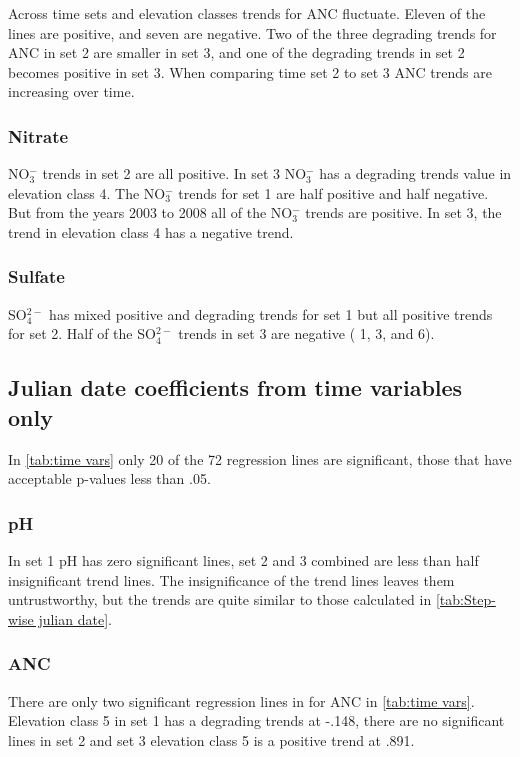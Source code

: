 Across time sets and elevation classes trends for ANC fluctuate.  Eleven of the lines are positive, and seven are negative.   Two of the three degrading trends for ANC in set 2 are smaller in set 3, and one of the degrading trends in set 2 becomes positive in set 3.  When comparing time set 2 to set 3 ANC trends are increasing over time. 

\subsubsection{Nitrate}

NO$_3^-$ trends in set 2 are all positive. In set 3 NO$_3^-$ has a degrading trends value in elevation class 4. The NO$_3^-$ trends for set 1 are half positive and half negative. But from the years 2003 to 2008 all of the NO$_3^-$ trends are positive. In set 3, the trend in elevation class 4 has a negative trend.

\subsubsection{Sulfate}

SO$_4^{2-}$ has mixed positive and degrading trends for set 1 but all positive trends for set 2. Half of the SO$_4^{2-}$ trends in set 3 are negative ( 1, 3, and 6).

\subsection{Julian date coefficients from time variables only}

In \autoref{tab:time vars} only 20 of the 72 regression lines are significant, those that have acceptable p-values less than .05.

\subsubsection{pH}

In set 1 pH has zero significant lines, set 2 and 3 combined are less than half insignificant trend lines. The insignificance of the trend lines leaves them untrustworthy, but the trends are quite similar to those calculated in \autoref{tab:Step-wise julian date}.

\subsubsection{ANC}

There are only two significant regression lines in for ANC in \autoref{tab:time vars}. Elevation class 5 in set 1 has a degrading trends at -.148, there are no significant lines in set 2 and set 3 elevation class 5 is a positive trend at .891.

